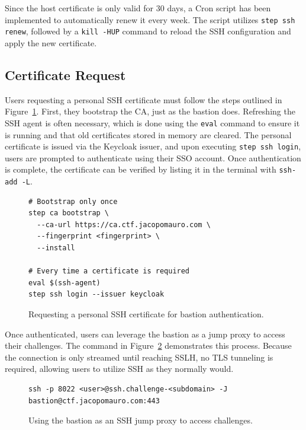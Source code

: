 Since the host certificate is only valid for 30 days, a Cron script has been implemented to automatically renew it every week. The script utilizes \texttt{step ssh renew}, followed by a \texttt{kill -HUP} command to reload the SSH configuration and apply the new certificate.

\subsection{Certificate Request}
Users requesting a personal SSH certificate must follow the steps outlined in Figure~\ref{fig:bastion_certificate_request}. First, they bootstrap the CA, just as the bastion does. Refreshing the SSH agent is often necessary, which is done using the \texttt{eval} command to ensure it is running and that old certificates stored in memory are cleared. The personal certificate is issued via the Keycloak issuer, and upon executing \texttt{step ssh login}, users are prompted to authenticate using their SSO account. Once authentication is complete, the certificate can be verified by listing it in the terminal with \texttt{ssh-add -L}.

\begin{figure}[h]
    \centering
\begin{verbatim}
# Bootstrap only once
step ca bootstrap \
  --ca-url https://ca.ctf.jacopomauro.com \
  --fingerprint <fingerprint> \
  --install

# Every time a certificate is required
eval $(ssh-agent)
step ssh login --issuer keycloak
\end{verbatim}
    \caption{Requesting a personal SSH certificate for bastion authentication.}
    \label{fig:bastion_certificate_request}
\end{figure}

Once authenticated, users can leverage the bastion as a jump proxy to access their challenges. The command in Figure~\ref{fig:bastion_ssh_command} demonstrates this process. Because the connection is only streamed until reaching SSLH, no TLS tunneling is required, allowing users to utilize SSH as they normally would.

\begin{figure}[h]
    \centering
\begin{verbatim}
ssh -p 8022 <user>@ssh.challenge-<subdomain> -J bastion@ctf.jacopomauro.com:443 
\end{verbatim}
    \caption{Using the bastion as an SSH jump proxy to access challenges.}
    \label{fig:bastion_ssh_command}
\end{figure}

